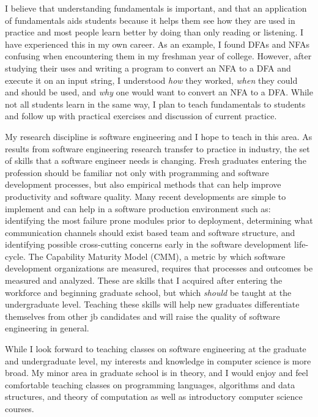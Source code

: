 \documentclass[10pt]{article}
\begin{document}
I believe that understanding fundamentals is important, and
that an application of fundamentals aids students because it helps them
see how they are used in practice and most people learn better by doing than only
reading or listening.  I have experienced this in my own career.
As an example, I found DFAs and NFAs confusing when encountering them in my
freshman year of college.  However, after studying their uses and writing a
program to convert an NFA to a DFA and execute it on an input string, I
understood \emph{how} they worked, \emph{when} they could and should be used,
and \emph{why} one would want to convert an NFA to a DFA.  While not all
students learn in the same way, I plan to teach fundamentals to students and
follow up with practical exercises and discussion of current practice.

My research discipline is software engineering and I hope to teach in this
area.  As results from software engineering research transfer to practice in
industry, the set of skills that a software engineer needs is changing. Fresh
graduates entering the profession should be familiar not only with programming
and software development processes, but also empirical methods that can help
improve productivity and software quality.  Many recent developments are simple
to implement and can help in a software production environment such as:
identifying the most failure prone modules prior to deployment, determining
what communication channels should exist based team and software structure, and
identifying possible cross-cutting concerns early in the software development
life-cycle.  The Capability Maturity Model (CMM), a metric by which
software development organizations are measured, requires that processes and
outcomes be measured and analyzed.  These are skills that I acquired after
entering the workforce and beginning graduate school, but which \emph{should}
be taught at the undergraduate level.  Teaching these skills will help new
graduates differentiate themselves from other jb candidates and will raise
the quality of software engineering in general.

While I look forward to teaching classes on software engineering at the
graduate and undergraduate level, my interests and knowledge in computer
science is more broad.  My minor area in graduate school is in theory, and I
would enjoy and feel comfortable teaching classes on programming languages,
algorithms and data structures, and theory of computation as well as
introductory computer science courses.
\end{document}

